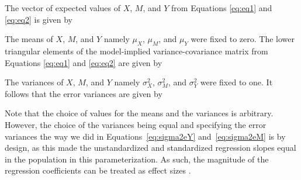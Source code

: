 \documentclass[man]{apa7}\usepackage[]{graphicx}\usepackage[]{xcolor}
\begin{document}
The vector of expected values of ${X}$, ${M}$, and ${Y}$ from Equations \ref{eq:eq1} and \ref{eq:eq2} is given by



\noindent The means of ${X}$, ${M}$, and ${Y}$
namely $\mu_{X}$, $\mu_{M}$, and $\mu_{Y}$ were fixed to zero.
The lower triangular elements
of the model-implied variance-covariance matrix
from Equations \ref{eq:eq1} and \ref{eq:eq2} are given by



\noindent The variances of ${X}$, ${M}$, and ${Y}$
namely $\sigma_{X}^{2}$, $\sigma_{M}^{2}$, and $\sigma_{Y}^{2}$
were fixed to one.
It follows that the error variances are given by





\noindent Note that the choice of values for the means and the variances is arbitrary.
However, the choice of the variances being equal and specifying the error variances the way we did in Equations~\ref{eq:sigma2eY} and~\ref{eq:sigma2eM}
is by design, as this made the unstandardized and standardized regression slopes equal in the population in this parameterization.
As such, the magnitude of the regression coefficients can be treated as effect sizes
\parencite{Lib-Mediation-Profile-Likelihood-Cheung-2009a}.
\end{document}
